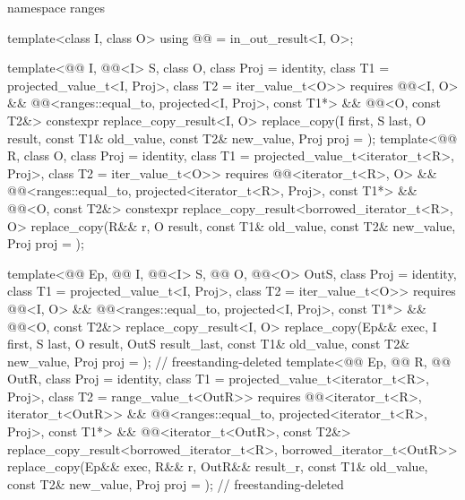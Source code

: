 \begin{codeblock}
{  namespace ranges {
    template<class I, class O>
      using @@ = in_out_result<I, O>;

    template<@@ I, @@<I> S, class O,
             class Proj = identity,
             class T1 = projected_value_t<I, Proj>, class T2 = iter_value_t<O>>
      requires @@<I, O> &&
               @@<ranges::equal_to, projected<I, Proj>, const T1*> &&
               @@<O, const T2&>
      constexpr replace_copy_result<I, O>
        replace_copy(I first, S last, O result, const T1& old_value, const T2& new_value,
                     Proj proj = {});
    template<@@ R, class O, class Proj = identity,
             class T1 = projected_value_t<iterator_t<R>, Proj>, class T2 = iter_value_t<O>>
      requires @@<iterator_t<R>, O> &&
               @@<ranges::equal_to,
                                         projected<iterator_t<R>, Proj>, const T1*> &&
               @@<O, const T2&>
      constexpr replace_copy_result<borrowed_iterator_t<R>, O>
        replace_copy(R&& r, O result, const T1& old_value, const T2& new_value,
                     Proj proj = {});

    template<@@ Ep, @@ I, @@<I> S,
             @@ O, @@<O> OutS,
             class Proj = identity,
             class T1 = projected_value_t<I, Proj>, class T2 = iter_value_t<O>>
      requires @@<I, O> &&
               @@<ranges::equal_to, projected<I, Proj>, const T1*> &&
               @@<O, const T2&>
      replace_copy_result<I, O>
        replace_copy(Ep&& exec, I first, S last, O result, OutS result_last, const T1& old_value,
                     const T2& new_value, Proj proj = {});      // freestanding-deleted
    template<@@ Ep, @@ R, @@ OutR,
             class Proj = identity, class T1 = projected_value_t<iterator_t<R>, Proj>,
             class T2 = range_value_t<OutR>>
      requires @@<iterator_t<R>, iterator_t<OutR>> &&
               @@<ranges::equal_to,
                                         projected<iterator_t<R>, Proj>, const T1*> &&
               @@<iterator_t<OutR>, const T2&>
      replace_copy_result<borrowed_iterator_t<R>, borrowed_iterator_t<OutR>>
        replace_copy(Ep&& exec, R&& r, OutR&& result_r, const T1& old_value, const T2& new_value,
                     Proj proj = {});                           // freestanding-deleted

}}
\end{codeblock}
